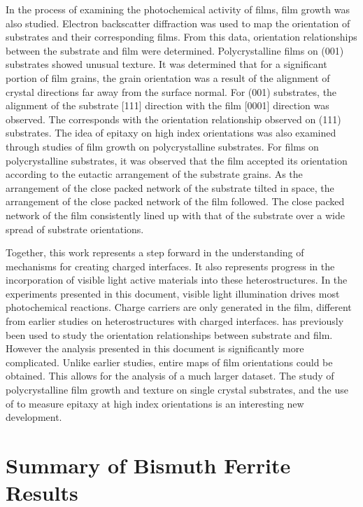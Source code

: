 In the process of examining the photochemical activity of  films, 
film growth was also studied. Electron backscatter diffraction was used to map the
orientation of substrates and their corresponding films. From this data, orientation
relationships between the substrate and film were determined. Polycrystalline films on
(001) substrates showed unusual texture. It was determined that for a
significant portion of film grains, the grain orientation was a result of the alignment of
crystal directions far away from the surface normal. For (001) substrates, the
alignment of the substrate [111] direction with the film [0001] direction was observed.
The corresponds with the orientation relationship observed on (111) substrates.
The idea of epitaxy on high index orientations was also examined through 
studies of film growth on polycrystalline substrates. For films on polycrystalline
substrates, it was observed that the film accepted its orientation according to the
eutactic arrangement of the substrate grains. As the arrangement of the close packed
network of the substrate tilted in space, the arrangement of the close packed network of
the film followed. The close packed network of the film consistently lined up with that of
the substrate over a wide spread of substrate orientations.

Together, this work represents a step forward in the understanding of mechanisms for
creating charged interfaces. It also represents progress in the incorporation of visible
light active materials into these heterostructures. In the experiments presented in this
document, visible light illumination drives most photochemical reactions. Charge carriers
are only generated in the film, different from earlier studies on heterostructures with
charged interfaces.  has previously been used to study the orientation
relationships between substrate and film. However the analysis presented in this document
is significantly more complicated. Unlike earlier studies, entire maps of film
orientations could be obtained. This allows for the analysis of a much larger dataset. The
study of polycrystalline film growth and texture on single crystal substrates, and the use
of  to measure epitaxy at high index orientations is an interesting new
development.

\section{Summary of Bismuth Ferrite Results}
\label{sec:conclusions.bfo.summary}

